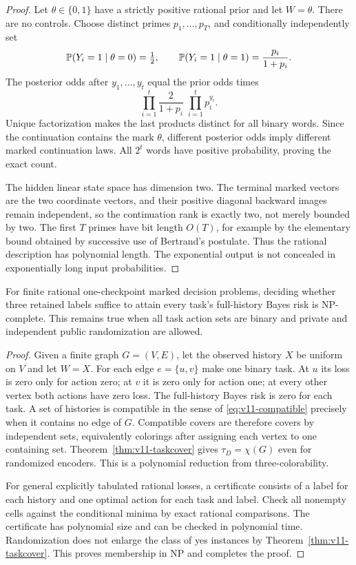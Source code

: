 \begin{proof}
Let $\theta\in\{0,1\}$ have a strictly positive rational prior and let
$W=\theta$. There are no controls. Choose distinct primes
$p_1,\ldots,p_T$, and conditionally independently set
\[
 \mathbb P(Y_i=1\mid\theta=0)=\tfrac12,
 \qquad
 \mathbb P(Y_i=1\mid\theta=1)=\frac{p_i}{1+p_i}.
\]
The posterior odds after $y_1,\ldots,y_t$ equal the prior odds times
\[
 \prod_{i=1}^t\frac{2}{1+p_i}\;
                    \prod_{i=1}^t p_i^{y_i}.
\]
Unique factorization makes the last products distinct for all binary
words. Since the continuation contains the mark $\theta$, different
posterior odds imply different marked continuation laws. All $2^t$
words have positive probability, proving the exact count.

The hidden linear state space has dimension two. The terminal marked
vectors are the two coordinate vectors, and their positive diagonal
backward images remain independent, so the continuation rank is exactly
two, not merely bounded by two. The first $T$ primes have bit length
$O(T)$, for example by the elementary bound obtained by successive use
of Bertrand's postulate. Thus the rational description has polynomial
length. The exponential output is not concealed in exponentially long
input probabilities.
\end{proof}

\begin{theorem}
\label{thm:v11-coloring}
For finite rational one-checkpoint marked decision problems, deciding
whether three retained labels suffice to attain every task's full-history
Bayes risk is NP-complete. This remains true when all task action sets
are binary and private and independent public randomization are allowed.
\end{theorem}

\begin{proof}
Given a finite graph $G=(V,E)$, let the observed history $X$ be uniform
on $V$ and let $W=X$. For each edge $e=\{u,v\}$ make one binary task.
At $u$ its loss is zero only for action zero; at $v$ it is zero only for
action one; at every other vertex both actions have zero loss. The
full-history Bayes risk is zero for each task. A set of histories is
compatible in the sense of \eqref{eq:v11-compatible} precisely when it
contains no edge of $G$. Compatible covers are therefore covers by
independent sets, equivalently colorings after assigning each vertex to
one containing set. Theorem~\ref{thm:v11-taskcover} gives
$\tau_D=\chi(G)$ even for randomized encoders. This is a polynomial
reduction from three-colorability.

For general explicitly tabulated rational losses, a certificate consists
of a label for each history and one optimal action for each task and
label. Check all nonempty cells against the conditional minima by exact
rational comparisons. The certificate has polynomial size and can be
checked in polynomial time. Randomization does not enlarge the class of
yes instances by Theorem~\ref{thm:v11-taskcover}. This proves membership
in NP and completes the proof.
\end{proof}

